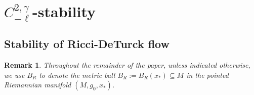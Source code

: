 \documentclass[12pt]{amsart}
\newcommand{\LB}{\left[}
\renewcommand{\1}{{\mathbf 1}}
\theoremstyle{others}
\newtheorem{rmk}[thm]{Remark}
\numberwithin{equation}{section}
\begin{document}

\vspace{10mm}





\section{$C^{2,\gamma}_{-\ell}$-stability} \label{sec: weighted Holder stability}



\subsection{Stability of Ricci-DeTurck flow}



\begin{rmk} 
    Throughout the remainder of the paper, unless indicated otherwise, we use $B_R$ to denote the metric ball $B_R := B_R(x_*) \subseteq M$ in the pointed Riemannian manifold $(M, g_0, x_*)$.
\end{rmk}
    
\end{document}
